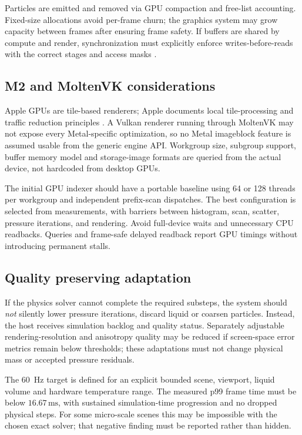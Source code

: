 \documentclass[10pt,a4paper]{article}
\newcommand{\ms}{\,\mathrm{ms}}
\begin{document}
Particles are emitted and removed via GPU compaction and free-list accounting. Fixed-size allocations avoid per-frame churn; the graphics system may grow capacity between frames after ensuring frame safety. If buffers are shared by compute and render, synchronization must explicitly enforce writes-before-reads with the correct stages and access masks \citep{vulkanSync}.

\subsection{M2 and MoltenVK considerations}
Apple GPUs are tile-based renderers; Apple documents local tile-processing and traffic reduction principles \citep{appleTile,appleMetal}. A Vulkan renderer running through MoltenVK may not expose every Metal-specific optimization, so no Metal imageblock feature is assumed usable from the generic engine API. Workgroup size, subgroup support, buffer memory model and storage-image formats are queried from the actual device, not hardcoded from desktop GPUs.

The initial GPU indexer should have a portable baseline using 64 or 128 threads per workgroup and independent prefix-scan dispatches. The best configuration is selected from measurements, with barriers between histogram, scan, scatter, pressure iterations, and rendering. Avoid full-device waits and unnecessary CPU readbacks. Queries and frame-safe delayed readback report GPU timings without introducing permanent stalls.

\subsection{Quality preserving adaptation}
If the physics solver cannot complete the required substeps, the system should \emph{not} silently lower pressure iterations, discard liquid or coarsen particles. Instead, the host receives simulation backlog and quality status. Separately adjustable rendering-resolution and anisotropy quality may be reduced if screen-space error metrics remain below thresholds; these adaptations must not change physical mass or accepted pressure residuals.

The $60$~Hz target is defined for an explicit bounded scene, viewport, liquid volume and hardware temperature range. The measured p99 frame time must be below $16.67\ms$, with sustained simulation-time progression and no dropped physical steps. For some micro-scale scenes this may be impossible with the chosen exact solver; that negative finding must be reported rather than hidden.
\end{document}
